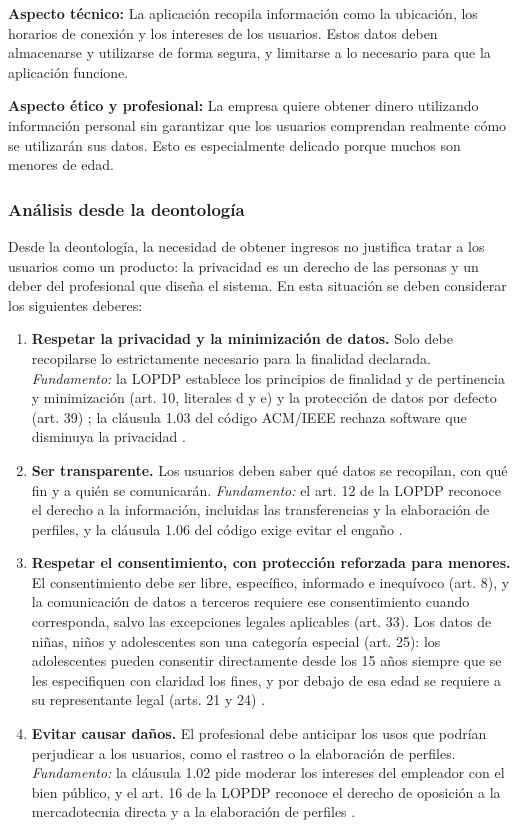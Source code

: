 \documentclass[12pt,a4paper,oneside]{article}
\newcommand{\cita}[1]{\cite{#1}}
\newcommand{\citaa}[2]{\cite{#1,#2}}
\begin{document}
\textbf{Aspecto técnico:} La aplicación recopila información como la ubicación, los horarios de conexión y los intereses de los usuarios. Estos datos deben almacenarse y utilizarse de forma segura, y limitarse a lo necesario para que la aplicación funcione.

\textbf{Aspecto ético y profesional:} La empresa quiere obtener dinero utilizando información personal sin garantizar que los usuarios comprendan realmente cómo se utilizarán sus datos. Esto es especialmente delicado porque muchos son menores de edad.

\subsubsection{Análisis desde la deontología}

Desde la deontología, la necesidad de obtener ingresos no justifica tratar a los usuarios como un producto: la privacidad es un derecho de las personas y un deber del profesional que diseña el sistema. En esta situación se deben considerar los siguientes deberes:

\begin{enumerate}[leftmargin=1.8em,itemsep=4pt]
    \item \textbf{Respetar la privacidad y la minimización de datos.} Solo debe recopilarse lo estrictamente necesario para la finalidad declarada. \emph{Fundamento:} la LOPDP establece los principios de finalidad y de pertinencia y minimización (art. 10, literales d y e) y la protección de datos por defecto (art. 39) \cita{ref:lopdp}; la cláusula 1.03 del código ACM/IEEE rechaza software que disminuya la privacidad \cita{ref:acm}.
    \item \textbf{Ser transparente.} Los usuarios deben saber qué datos se recopilan, con qué fin y a quién se comunicarán. \emph{Fundamento:} el art. 12 de la LOPDP reconoce el derecho a la información, incluidas las transferencias y la elaboración de perfiles, y la cláusula 1.06 del código exige evitar el engaño \citaa{ref:lopdp}{ref:acm}.
    \item \textbf{Respetar el consentimiento, con protección reforzada para menores.} El consentimiento debe ser libre, específico, informado e inequívoco (art. 8), y la comunicación de datos a terceros requiere ese consentimiento cuando corresponda, salvo las excepciones legales aplicables (art. 33). Los datos de niñas, niños y adolescentes son una categoría especial (art. 25): los adolescentes pueden consentir directamente desde los 15 años siempre que se les especifiquen con claridad los fines, y por debajo de esa edad se requiere a su representante legal (arts. 21 y 24) \cita{ref:lopdp}.
    \item \textbf{Evitar causar daños.} El profesional debe anticipar los usos que podrían perjudicar a los usuarios, como el rastreo o la elaboración de perfiles. \emph{Fundamento:} la cláusula 1.02 pide moderar los intereses del empleador con el bien público, y el art. 16 de la LOPDP reconoce el derecho de oposición a la mercadotecnia directa y a la elaboración de perfiles \citaa{ref:acm}{ref:lopdp}.
\end{enumerate}
\end{document}
